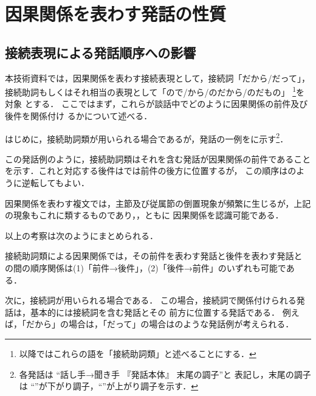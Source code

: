 \section{因果関係を表わす発話の性質}

\subsection{接続表現による発話順序への影響}

本技術資料では，因果関係を表わす接続表現として，接続詞「だから/だって」，
接続助詞もしくはそれ相当の表現として「ので/から/のだから/のだもの」
\footnote{以降ではこれらの語を「接続助詞類」と述べることにする．}を対象
とする．
ここではまず，これらが談話中でどのように因果関係の前件及び後件を関係付け
るかについて述べる．

はじめに，接続助詞類が用いられる場合であるが，発話の一例をに示す\footnote{各発話は ``話し手→聞き手 『発話本体』 末尾の調子''と
表記し，末尾の調子は ``\da''が下がり調子，``\ua''が上がり調子を示す．}．


この発話例のように，接続助詞類はそれを含む発話が因果関係の前件であること
を示す．これと対応する後件はでは前件の後方に位置するが，
この順序はのように逆転してもよい．


因果関係を表わす複文では，主節及び従属節の倒置現象が頻繁に生じるが，上記
の現象もこれに類するものであり，，ともに
因果関係を認識可能である．

以上の考察は次のようにまとめられる．

\begin{screen}
 \begin{obs}
  接続助詞類による因果関係では，その前件を表わす発話と後件を表わす発話と
  の間の順序関係は(1)「前件→後件」，(2)「後件→前件」のいずれも可能であ
  る．
 \end{obs}
\end{screen}

次に，接続詞が用いられる場合である．
この場合，接続詞で関係付けられる発話は，基本的には接続詞を含む発話とその
前方に位置する発話である\cite{三上:現代語法序説,森田:基礎日本語2}．
例えば，「だから」の場合は，「だって」の場合はのような発話例が考えられる．

